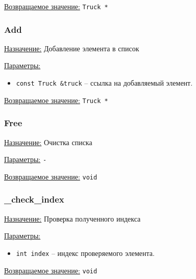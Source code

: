 \underline{Возвращаемое значение:} \verb|Truck *|


\subsubsection*{Add}

\underline{Назначение:} Добавление элемента в список

\underline{Параметры:} 

\begin{itemize}
    \item \verb|const Truck &truck| -- ссылка на добавляемый элемент.
\end{itemize}

\underline{Возвращаемое значение:} \verb|Truck *|

\begin{comment}
\subsubsection*{Delete}

\underline{Назначение:} Удаление элемента из списка

\underline{Параметры:} \verb|int index|

\underline{Возвращаемое значение:} \verb|void|
\end{comment}


\subsubsection*{Free}

\underline{Назначение:} Очистка списка

\underline{Параметры:} \verb|-|

\underline{Возвращаемое значение:} \verb|void|


\subsubsection*{\_check\_index}

\underline{Назначение:} Проверка полученного индекса

\underline{Параметры:} 

\begin{itemize}
    \item \verb|int index| -- индекс проверяемого элемента.
\end{itemize}

\underline{Возвращаемое значение:} \verb|void|


